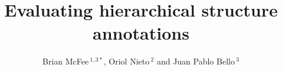 \documentclass{frontiersSCNS} %
\def\firstAuthorLast{McFee {et~al.}} %
\def\Authors{Brian McFee\,$^{1,3*}$, Oriol Nieto\,$^{2}$ and Juan Pablo Bello\,$^3$}
\begin{document}
\onecolumn
{}

\title{Evaluating hierarchical structure annotations}

\author[\firstAuthorLast ]{\Authors} %
\address{} %
\correspondance{} %

\extraAuth{}%


\maketitle

\end{document}
